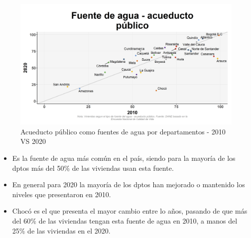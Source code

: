     \begin{figure}[H]
        \caption{Acueducto público como fuentes de agua por departamentos - 2010 VS 2020 \label{map_result_2} }
        \begin{center}
        \includegraphics[width=\textwidth,keepaspectratio]{img/var_129_scatter_time.png}
        \end{center}
    \end{figure}
            \begin{itemize}
                    \item Es la fuente de agua más común en el país, siendo para la mayoría de los dptos más del 50\% de las viviendas usan esta fuente.
                    \item En general para 2020 la mayoría de los dptos han mejorado o mantenido los niveles que presentaron en 2010.
                    \item Chocó es el que presenta el mayor cambio entre lo años, pasando de que más del 60\% de las viviendas tengan esta fuente de agua en 2010, a manos del 25\% de las viviendas en el 2020.
                    \end{itemize}

